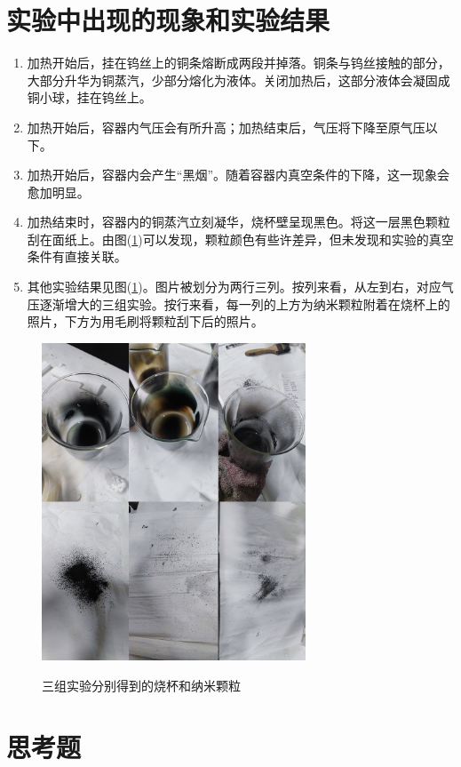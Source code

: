 \documentclass[a4paper]{article}
\begin{document}
\section{实验中出现的现象和实验结果}
\begin{enumerate}
\item 加热开始后，挂在钨丝上的铜条熔断成两段并掉落。铜条与钨丝接触的部分，大部分升华为铜蒸汽，少部分熔化为液体。关闭加热后，这部分液体会凝固成铜小球，挂在钨丝上。
\item 加热开始后，容器内气压会有所升高；加热结束后，气压将下降至原气压以下。
\item 加热开始后，容器内会产生“黑烟”。随着容器内真空条件的下降，这一现象会愈加明显。
\item 加热结束时，容器内的铜蒸汽立刻凝华，烧杯壁呈现黑色。将这一层黑色颗粒刮在面纸上。由图(\ref{fig7})可以发现，颗粒颜色有些许差异，但未发现和实验的真空条件有直接关联。
\item 其他实验结果见图(\ref{fig7})。图片被划分为两行三列。按列来看，从左到右，对应气压逐渐增大的三组实验。按行来看，每一列的上方为纳米颗粒附着在烧杯上的照片，下方为用毛刷将颗粒刮下后的照片。
\end{enumerate}

\begin{figure}[!ht]
\centering
\includegraphics[width=0.7\textwidth]{img/final.png}\\
\caption{三组实验分别得到的烧杯和纳米颗粒}\label{fig7}
\end{figure}


\section{思考题}
\end{document}
